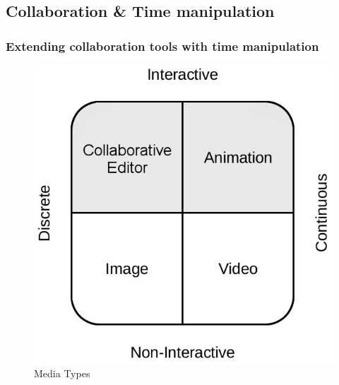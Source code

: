 \documentclass[compress]{beamer}
\begin{document}
	\subsection{Collaboration \& Time manipulation}
  		\begin{frame}[c]
		\frametitle{Extending collaboration tools with time manipulation}
	
		\begin{figure}
			\includegraphics[height=0.5\textheight]{figures/media_types.png}
			\caption{Media Types}
		\end{figure}
		\end{frame}
\end{document}
